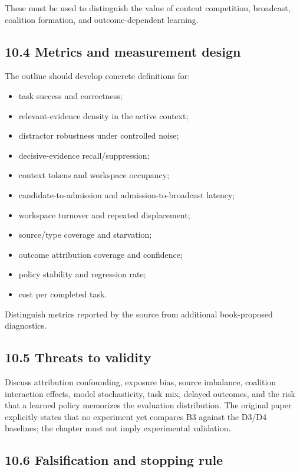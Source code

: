 These must be used to distinguish the value of content competition, broadcast, coalition formation, and outcome-dependent learning.

\subsection{10.4 Metrics and measurement design}\label{104-metrics-and-measurement-design}

The outline should develop concrete definitions for:

\begin{itemize}
\tightlist
\item
  task success and correctness;
\item
  relevant-evidence density in the active context;
\item
  distractor robustness under controlled noise;
\item
  decisive-evidence recall/suppression;
\item
  context tokens and workspace occupancy;
\item
  candidate-to-admission and admission-to-broadcast latency;
\item
  workspace turnover and repeated displacement;
\item
  source/type coverage and starvation;
\item
  outcome attribution coverage and confidence;
\item
  policy stability and regression rate;
\item
  cost per completed task.
\end{itemize}

Distinguish metrics reported by the source from additional book-proposed diagnostics.

\subsection{10.5 Threats to validity}\label{105-threats-to-validity}

Discuss attribution confounding, exposure bias, source imbalance, coalition interaction effects, model stochasticity, task mix, delayed outcomes, and the risk that a learned policy memorizes the evaluation distribution. The original paper explicitly states that no experiment yet compares B3 against the D3/D4 baselines; the chapter must not imply experimental validation.

\subsection{10.6 Falsification and stopping rule}\label{106-falsification-and-stopping-rule}

